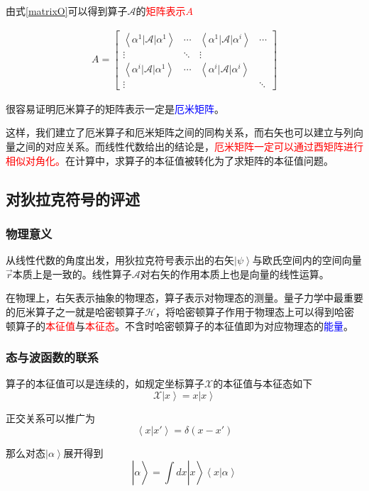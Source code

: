 \documentclass[UTF8,12pt]{article}
\providecommand\Ket[1]{\left|\right. #1 \left.\right\rangle}
\providecommand\Bracket[2]{\left\langle #1 \big| #2 \right\rangle}
\providecommand\BraCket[3]{\left\langle #1 \big| #2 \big| #3 \right\rangle}
\numberwithin{equation}{subsection}
\providecommand{\empB}[1]{\textcolor{blue}{#1}}
\providecommand{\empR}[1]{\textcolor{red}{#1}}
\begin{document}
	由式\ref{matrixO}可以得到算子$\mathcal A$的\empR{矩阵表示$A$}\begin{snugshade}
		\begin{equation}
			\begin{aligned}
				A = \begin{bmatrix}
					\BraCket{\alpha^1}{\mathcal A}{\alpha^1}&\cdots&\BraCket{\alpha^1}{\mathcal A}{\alpha^i}&\cdots\\
					\vdots&\ddots&\vdots&\\
					\BraCket{\alpha^i}{\mathcal A}{\alpha^1}&\cdots&\BraCket{\alpha^i}{\mathcal A}{\alpha^i}\\
					\vdots&&&\ddots
				\end{bmatrix}
			\end{aligned}
			\label{matrix}
		\end{equation}
	\end{snugshade}

	很容易证明厄米算子的矩阵表示一定是\empB{厄米矩阵}。

	这样，我们建立了厄米算子和厄米矩阵之间的同构关系，而右矢也可以建立与列向量之间的对应关系。而线性代数给出的结论是，\empR{厄米矩阵一定可以通过酉矩阵进行相似对角化。}在计算中，求算子的本征值被转化为了求矩阵的本征值问题。
	\subsection{对狄拉克符号的评述}
	\subsubsection{物理意义}
	从线性代数的角度出发，用狄拉克符号表示出的右矢$\Ket{\psi}$与欧氏空间内的空间向量$\vec r$本质上是一致的。线性算子$\mathcal A$对右矢的作用本质上也是向量的线性运算。
	
	在物理上，右矢表示抽象的物理态，算子表示对物理态的测量。量子力学中最重要的厄米算子之一就是哈密顿算子$\mathcal H$，将哈密顿算子作用于物理态上可以得到哈密顿算子的\empR{本征值}与\empR{本征态}。不含时哈密顿算子的本征值即为对应物理态的\empB{能量}。
	\subsubsection{态与波函数的联系}
	算子的本征值可以是连续的，如规定坐标算子$\mathcal X$的本征值与本征态如下$$\mathcal X\Ket{x} = x\Ket{x}$$
	
	正交关系可以推广为$$\Bracket{x}{x'}=\delta(x-x')$$
	
	那么对态$\Ket{\alpha}$展开得到$$\Ket{\alpha} = \int dx\Ket{x}\Bracket{x}{\alpha}$$
	
\end{document}
